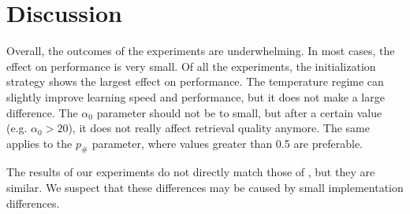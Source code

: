 \section{Discussion}

Overall, the outcomes of the experiments are underwhelming. In most cases, the effect on performance is very small. Of all the experiments, the initialization strategy shows the largest effect on performance. The temperature regime can slightly improve learning speed and performance, but it does not make a large difference. The $\alpha_0$ parameter should not be to small, but after a certain value (e.g. $\alpha_0 > 20$), it does not really affect retrieval quality anymore. The same applies to the $p_\#$ parameter, where values greater than 0.5 are preferable.

The results of our experiments do not directly match those of \cite{Goldwater200921}, but they are similar. We suspect that these differences may be caused by small implementation differences.

